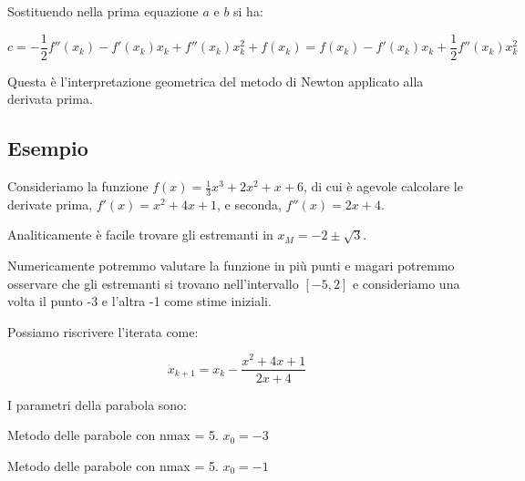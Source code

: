 \documentclass[12pt]{article}
\theoremstyle{plain}%
\theoremstyle{definition}
\theoremstyle{remark}
\begin{document}
Sostituendo nella prima equazione $a$ e $b$ si ha:

$$c = - \frac{1}{2} f''(x_k) - f'(x_k) x_k + f''(x_k) x_k^2 + f(x_k) = f(x_k)  - f'(x_k) x_k + \frac{1}{2} f''(x_k) x_k^2$$


Questa è l'interpretazione geometrica del metodo di Newton applicato alla derivata prima.

\subsection{Esempio}

Consideriamo la funzione $f(x) = \frac{1}{3} x^3 + 2 x^2 + x + 6$, di cui è agevole
calcolare le derivate prima, $f'(x) = x^2 + 4 x + 1$, e seconda, $f''(x) = 2x + 4$.

Analiticamente è facile trovare gli estremanti in $x_M = -2 \pm \sqrt{3}$.

Numericamente potremmo valutare la funzione in più punti e magari potremmo osservare
che gli estremanti si trovano nell'intervallo $[-5, 2]$ e consideriamo una volta il
punto -3 e l'altra -1 come stime iniziali.

Possiamo riscrivere l'iterata come:

$$x_{k+1} = x_k - \frac{x^2 + 4 x + 1}{2x + 4}$$

I parametri della parabola sono:



\begin{table}
    \begin{center}
\end{center}        
\caption[]{Metodo delle parabole con nmax = 5. $x_0 = -3$}
\label{tbl:par_es1}
\end{table}



\begin{table}
    \begin{center}
\end{center}        
\caption[]{Metodo delle parabole con nmax = 5. $x_0 = -1$}
\label{tbl:par_es2}
\end{table}

%     
\end{document}
